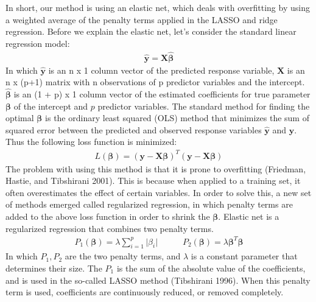 \documentclass[
]{article}
\begin{document}
In short, our method is using an elastic net, which deals with
overfitting by using a weighted average of the penalty terms applied in
the LASSO and ridge regression. Before we explain the elastic net, let's
consider the standard linear regression model: \begin{align*}
    \hat{\boldsymbol{y}} = \mathbf{X}\boldsymbol{\hat{\beta}}
\end{align*} In which \(\hat{\boldsymbol{y}}\) is an n x 1 column vector
of the predicted response variable, \(\mathbf{X}\) is an n x (p+1)
matrix with n observations of p predictor variables and the intercept.
\(\boldsymbol{\hat{\beta}}\) is an (1 + p) x 1 column vector of the
estimated coefficients for true parameter \(\boldsymbol{{\beta}}\) of
the intercept and \(p\) predictor variables. The standard method for
finding the optimal \(\boldsymbol{\beta}\) is the ordinary least squared
(OLS) method that minimizes the sum of squared error between the
predicted and observed response variables \(\hat{\boldsymbol{y}}\) and
\({\boldsymbol{y}}\). Thus the following loss function is minimized:
\begin{align*}
    L(\boldsymbol{\beta}) = (\boldsymbol{y} - \mathbf{X}\boldsymbol{\beta})^T(\boldsymbol{y} - \mathbf{X}\boldsymbol{\beta})
\end{align*} The problem with using this method is that it is prone to
overfitting (Friedman, Hastie, and Tibshirani 2001). This is because
when applied to a training set, it often overestimates the effect of
certain variables. In order to solve this, a new set of methods emerged
called regularized regression, in which penalty terms are added to the
above loss function in order to shrink the \(\boldsymbol{\beta}\).
Elastic net is a regularized regression that combines two penalty terms.
\begin{align*}
    P_1(\boldsymbol{\beta}) = \lambda \sum_{i=1}^{p} \vert \beta_i \vert \hspace{35pt} P_2(\boldsymbol{\beta}) = \lambda \boldsymbol{\beta}^T\boldsymbol{\beta}
\end{align*} In which \(P_1, P_2\) are the two penalty terms, and
\(\lambda\) is a constant parameter that determines their size. The
\(P_1\) is the sum of the absolute value of the coefficients, and is
used in the so-called LASSO method (Tibshirani 1996). When this penalty
term is used, coefficients are continuously reduced, or removed
completely.
\end{document}
